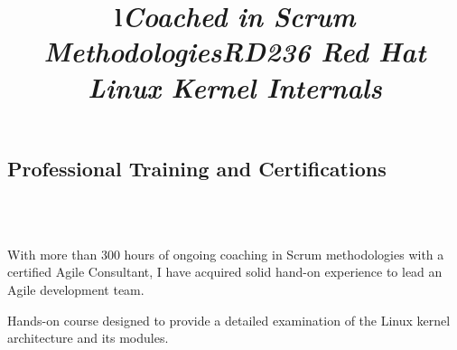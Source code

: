 \documentclass[overlapped,line,letterpaper]{res}
\begin{document}
\begin{resume}



  \section{\bf Professional Training and Certifications}

  \begin{format}
    \title{l}\\
    \body\\
  \end{format}

  \title{\em Coached in Scrum Methodologies}
  \begin{position}
    With more than 300 hours of ongoing coaching in Scrum methodologies with a
    certified Agile Consultant, I have acquired solid hand-on experience to lead
    an Agile development team.
  \end{position}




  \title{\em RD236 Red Hat Linux Kernel Internals}
  \begin{position}
    Hands-on course designed to provide a detailed examination of the
    Linux kernel architecture and its modules.
  \end{position}


\end{resume}
\end{document}
